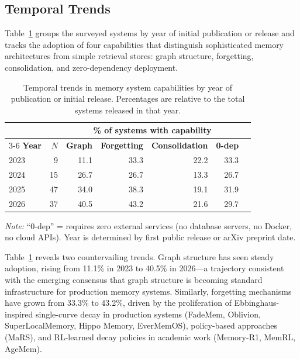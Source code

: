 \subsection{Temporal Trends}
\label{sec:temporal-trends}

Table~\ref{tab:temporal-trends} groups the surveyed systems by year of initial
publication or release and tracks the adoption of four capabilities that
distinguish sophisticated memory architectures from simple retrieval stores:
graph structure, forgetting, consolidation, and zero-dependency deployment.

\begin{table}[!t]
\centering
\caption{Temporal trends in memory system capabilities by year of publication or initial release. Percentages are relative to the total systems released in that year.}
\label{tab:temporal-trends}
\small
\begin{tabular}{@{}lrrrrrr@{}}
\toprule
& & \multicolumn{4}{c}{\textbf{\% of systems with capability}} \\
\cmidrule(l){3-6}
\textbf{Year} & \textbf{$N$} & \textbf{Graph} & \textbf{Forgetting} & \textbf{Consolidation} & \textbf{0-dep} \\
\midrule
2023 &  9 & 11.1 & 33.3 & 22.2 & 33.3 \\
2024 & 15 & 26.7 & 26.7 & 13.3 & 26.7 \\
2025 & 47 & 34.0 & 38.3 & 19.1 & 31.9 \\
2026 & 37 & 40.5 & 43.2 & 21.6 & 29.7 \\
\bottomrule
\end{tabular}
\vspace{0.3em}
\begin{flushleft}
\footnotesize
\textit{Note:} ``0-dep'' = requires zero external services (no database servers, no Docker, no cloud APIs). Year is determined by first public release or arXiv preprint date.
\end{flushleft}
\end{table}

Table~\ref{tab:temporal-trends} reveals two countervailing trends. Graph
structure has seen steady adoption, rising from 11.1\% in 2023 to 40.5\% in
2026---a trajectory consistent with the emerging consensus that graph structure
is becoming standard infrastructure for production memory systems. Similarly, forgetting mechanisms have
grown from 33.3\% to 43.2\%, driven by the proliferation of
Ebbinghaus-inspired single-curve decay in production systems (FadeMem,
Oblivion, SuperLocalMemory, Hippo Memory, EverMemOS), policy-based
approaches (MaRS), and RL-learned decay policies in academic work
(Memory-R1, MemRL, AgeMem).


